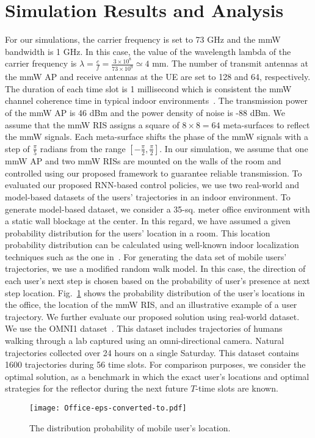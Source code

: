 \documentclass[conference]{IEEEtran}
\begin{document}
\section{Simulation Results and Analysis}\label{Sec:Simulation}
For our simulations, the carrier frequency is set to 73 GHz and the mmW bandwidth is 1 GHz. In this case, the value of the wavelength lambda of the carrier frequency is $\lambda=\frac{c}{f}=\frac{3\times 10^8}{73 \times 10^9}\simeq 4$ mm. The number of transmit antennas at the mmW AP and receive antennas at the UE are set to 128 and 64, respectively. The duration of each time slot is 1 millisecond which is consistent the mmW channel coherence time in typical indoor environments~\cite{sevenn}. The transmission power of the mmW AP is 46 dBm and the power density of noise is -88 dBm.  We assume that the mmW RIS assigns a square of $8\times8=64$ meta-surfaces to reflect the mmW signals. Each meta-surface shifts the phase of the mmW signals with a step of $\frac{\pi}{5}$ radians from the range $[-\frac{\pi}{2},\frac{\pi}{2}]$. In our simulation, we assume that one mmW AP and two mmW RISs are mounted on the walls of the room and controlled using our proposed framework to guarantee reliable transmission. To evaluated our proposed RNN-based control policies, we use two real-world and model-based datasets of the users' trajectories in an indoor environment. To generate model-based dataset, we consider a 35-sq. meter office environment with a static wall blockage at the center. In this regard, we have assumed a given probability distribution for the users' location in a room.  This location probability distribution can be calculated using well-known indoor localization techniques such as the one in~\cite{three}. For generating the data set of mobile users' trajectories, we use a modified random walk model. In this case, the direction of each user's next step is chosen based on the probability of user's presence at next step location. Fig.~\ref{Simulation_model} shows the probability distribution of the user's locations in the office, the location of the mmW RIS, and an illustrative example of a user trajectory. We further evaluate our proposed solution using real-world dataset. We use the OMNI1 dataset~\cite{dataset}. This dataset includes trajectories of humans walking through a lab captured using an omni-directional camera. Natural trajectories collected over 24 hours on a single Saturday. This dataset contains 1600 trajectories during 56 time slots. For comparison purposes, we consider the optimal solution, as a benchmark in which the exact user's locations and optimal strategies for the reflector during the next future $T$-time slots are known.
\vspace{-0.1cm}
\begin{figure}[!t]
	\begin{center}
		\texttt{[image: Office-eps-converted-to.pdf]}	
	    \vspace{-0.1cm}
		\caption{ \small The distribution probability of mobile user's location.}
        \vspace{-1cm}
		\label{Simulation_model}
	\end{center}
\end{figure}
\end{document}
